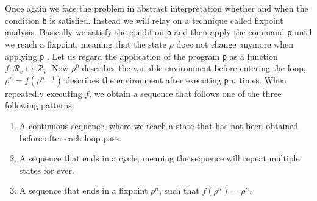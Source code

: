 \noindent Once again we face the problem in abstract interpretation whether and when the condition \texttt{b} is satisfied. Instead we will relay on a technique called fixpoint analysis. Basically we satisfy the condition \texttt{b} and then apply the command \texttt{p} until we reach a fixpoint, meaning that the state $\rho$ does not change anymore when applying \texttt{p} \cite{cousot1977}. Let us regard the application of the program \texttt{p} as a function $f: \mathcal{R}_v\mapsto \mathcal{R}_v$. Now $\rho^0$ describes the variable environment before entering the loop, $\rho^n=f(\rho^{n-1})$ describes the environment after executing \texttt{p} $n$ times. When repeatedly executing $f$, we obtain a sequence that follows one of the three following patterns:

\begin{enumerate}
	\item A continuous sequence, where we reach a state that has not been obtained before after each loop pass.\\
\begin{center}
\end{center}

	\item \parbox[t]{\linewidth}{A sequence that ends in a cycle, meaning the sequence will repeat multiple states for ever.\\
\begin{center}
\end{center}
}
	\item A sequence that ends in a fixpoint $\rho^n$, such that $f(\rho^n)=\rho^n$.\\
\begin{center}
\end{center}
\end{enumerate}
